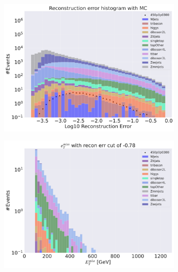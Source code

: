 \begin{figure}[H]
    \centering
    \begin{subfigure}{.40\textwidth}
        \includegraphics[width=\textwidth]{Figures/AE_testing/big/3lep/b_data_recon_big_rm3_feats_sig_450p0p0300.pdf}
        \caption{ }
        \label{fig:AE_3lep_big_450_3}
    \end{subfigure}
    \hfill
    \begin{subfigure}{.40\textwidth}
        \includegraphics[width=\textwidth]{Figures/AE_testing/big/3lep/b_data_recon_big_rm3_feats_sig_450p0p0300_etmiss_recon_errcut_-0.78.pdf}
        \caption{}
        \label{fig:AE_3lep_big_etmiss_450_3}
    \end{subfigure}

\end{figure}
